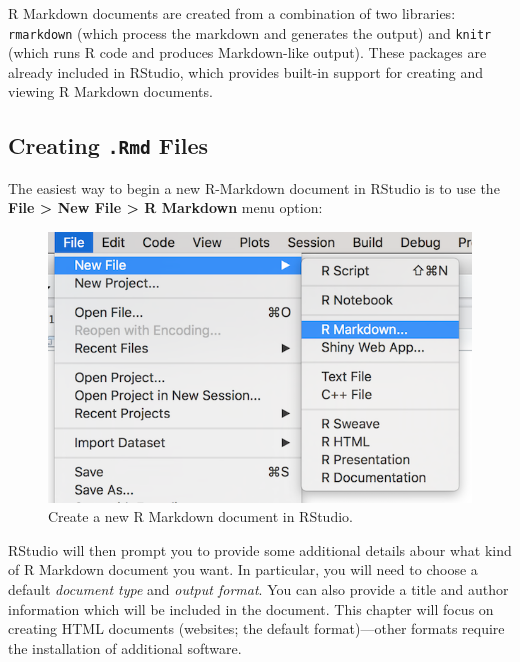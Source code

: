 \documentclass[]{book}
\theoremstyle{definition}
\theoremstyle{definition}
\theoremstyle{remark}
\begin{document}
R Markdown documents are created from a combination of two libraries:
\texttt{rmarkdown} (which process the markdown and generates the output)
and \texttt{knitr} (which runs R code and produces Markdown-like
output). These packages are already included in RStudio, which provides
built-in support for creating and viewing R Markdown documents.

\subsection{\texorpdfstring{Creating \texttt{.Rmd}
Files}{Creating .Rmd Files}}\label{creating-.rmd-files}

The easiest way to begin a new R-Markdown document in RStudio is to use
the \textbf{File \textgreater{} New File \textgreater{} R Markdown} menu
option:

\begin{figure}
\centering
\includegraphics{img/r-markdown/new-file.png}
\caption{Create a new R Markdown document in RStudio.}
\end{figure}

RStudio will then prompt you to provide some additional details abour
what kind of R Markdown document you want. In particular, you will need
to choose a default \emph{document type} and \emph{output format}. You
can also provide a title and author information which will be included
in the document. This chapter will focus on creating HTML documents
(websites; the default format)---other formats require the installation
of additional software.
\end{document}
